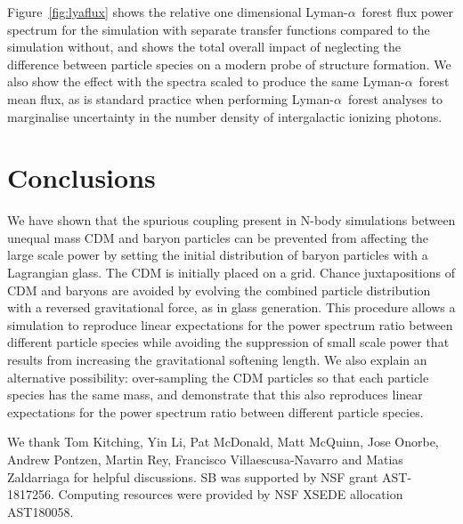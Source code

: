 \documentclass[a4paper,11pt]{article}
\newcommand{\Lya}{Lyman-$\alpha$}
\begin{document}
Figure~\ref{fig:lyaflux} shows the relative one dimensional \Lya~forest flux power spectrum for the simulation with separate transfer functions compared to the simulation without, and shows the total overall impact of neglecting the difference between particle species on a modern probe of structure formation. We also show the effect with the spectra scaled to produce the same \Lya~forest mean flux, as is standard practice when performing \Lya~forest analyses to marginalise uncertainty in the number density of intergalactic ionizing photons.

\section{Conclusions}
\label{sec:conclude}

We have shown that the spurious coupling present in N-body simulations between unequal mass CDM and baryon particles can be prevented from affecting the large scale power by setting the initial distribution of baryon particles with a Lagrangian glass. The CDM is initially placed on a grid. Chance juxtapositions of CDM and baryons are avoided by evolving the combined particle distribution with a reversed gravitational force, as in glass generation. This procedure allows a simulation to reproduce linear expectations for the power spectrum ratio between different particle species while avoiding the suppression of small scale power that results from increasing the gravitational softening length. We also explain an alternative possibility: over-sampling the CDM particles so that each particle species has the same mass, and demonstrate that this also reproduces linear expectations for the power spectrum ratio between different particle species.

\acknowledgments

We thank Tom Kitching, Yin Li, Pat McDonald, Matt McQuinn, Jose Onorbe, Andrew Pontzen, Martin Rey, Francisco Villaescusa-Navarro and Matias Zaldarriaga for helpful discussions. SB was supported by NSF grant AST-1817256. Computing resources were provided by NSF XSEDE allocation AST180058.



\end{document}
